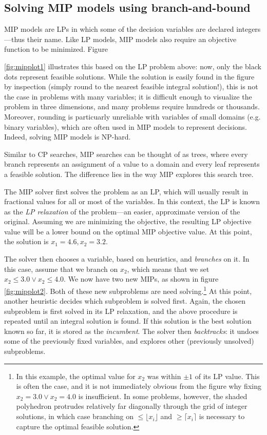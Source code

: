 \documentclass[13pt, letterpaper, oneside]{book}
\begin{document}
\subsection{Solving MIP models using branch-and-bound}
MIP models are LPs in which some of the decision variables are declared
integers---thus their name.  Like LP models, MIP models also require an
objective function to be minimized. Figure

\ref{fig:mipplot1} illustrates this based on the LP problem above: now, only the
black dots represent feasible solutions. While the solution is easily found in
the figure by inspection (simply round to the nearest feasible integral
solution!), this is not the case in problems with many variables; it is
difficult enough to visualize the problem in three dimensions, and many problems
require hundreds or thousands. Moreover, rounding is particuarly unreliable 
with variables of small domains (e.g. binary variables), which are often used in
MIP models to represent decisions. Indeed, solving MIP models is NP-hard.

Similar to CP searches, MIP searches can be thought of as trees, where every
branch represents an assignment of a value to a domain and every leaf represents
a feasible solution. The difference lies in the way MIP explores this search tree.

The MIP solver first solves the problem as an LP, which will usually result in
fractional values for all or most of the variables. In this context, the LP is
known as the \textit{LP relaxation} of the problem---an easier, approximate
version of the original. Assuming we are minimizing the objective, the resulting
LP objective value will be a lower bound on the optimal MIP objective value.
At this point, the solution is $x_1 = 4.6, x_2 = 3.2$.

The solver then chooses a variable, based on heuristics, and \textit{branches}
on it. In this case, assume that we branch on $x_2$, which means that we set
$x_2 \leq 3.0 \lor x_2 \leq 4.0$. We now have two new MIPs, as shown in figure
\ref{fig:mipplot2}. Both of these new subproblems are need solving.\footnote{In
this example, the optimal value for $x_2$ was
within $\pm1$ of its LP value.  This is often the case, and it is not
immediately obvious from the figure why fixing $x_2 = 3.0 \lor x_2 = 4.0$ is
insufficient. In some problems, however, the shaded polyhedron protrudes
relatively far diagonally through the grid of integer solutions, in which case
branching on $\leq \lfloor x_i \rfloor$ and $\geq \lceil x_i \rceil$ is
necessary to capture the optimal feasible solution.} At
this point, another heuristic decides which subproblem is solved first.
Again, the chosen subproblem is first solved in its LP relaxation, and the above
procedure is repeated until an integral solution is found. If this solution is
the best solution known so far, it is stored as the \textit{incumbent}. The
solver then \textit{backtracks}: it undoes some of the previously fixed variables,
and explores other (previously unsolved) subproblems.
\end{document}
